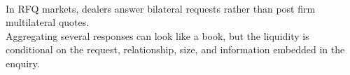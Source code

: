 \documentclass[a4paper,oneside,openany]{book}
\begin{document}
\begin{caveat} \\
In RFQ markets, dealers answer bilateral requests rather than post firm multilateral quotes.\\
Aggregating several responses can look like a book, but the liquidity is conditional on the request, relationship, size, and information embedded in the enquiry.
\end{caveat}
\end{document}
